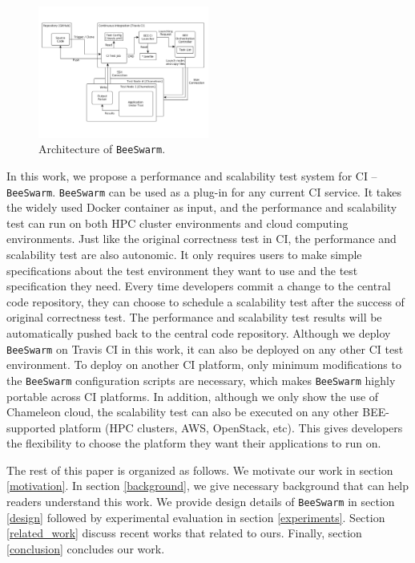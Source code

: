 \begin{figure}[h]
    \centering
    \includegraphics[width=0.5\textwidth]{figures/beeSwarm_Arch_ver02.pdf}
    \caption{Architecture of \texttt{BeeSwarm}. %
    }
    \label{arch}
\end{figure}


In this work, we propose a performance and scalability test system for CI -- \texttt{BeeSwarm}. \texttt{BeeSwarm} can be used as a plug-in for any current CI service. It takes the widely used Docker container as input, and the performance and scalability test can run on both HPC cluster environments and cloud computing environments. Just like the original correctness test in CI, the performance and scalability test are also autonomic. It only requires users to make simple specifications about the test environment they want to use and the test specification they need. Every time developers commit a change to the central code repository, they can choose to schedule a scalability test after the success of original correctness test. The performance and scalability test results will be automatically pushed back to the central code repository. %
Although we deploy \texttt{BeeSwarm} on Travis CI in this work, it can also be deployed on any other CI test environment. To deploy on another CI platform, only minimum modifications to the \texttt{BeeSwarm} configuration scripts are necessary, which makes \texttt{BeeSwarm} highly portable across CI platforms. In addition, although we only show the use of Chameleon cloud, the scalability test can also be executed on any other BEE-supported platform (HPC clusters, AWS, OpenStack, etc). This gives developers the flexibility to choose the platform they want their applications to run on.

The rest of this paper is organized as follows. We motivate our work in section \ref{motivation}. In section \ref{background}, we give necessary background that can help readers understand this work. We provide design details of \texttt{BeeSwarm} in section \ref{design} followed by experimental evaluation in section \ref{experiments}. Section \ref{related_work} discuss recent works that related to ours. Finally, section \ref{conclusion} concludes our work. %

